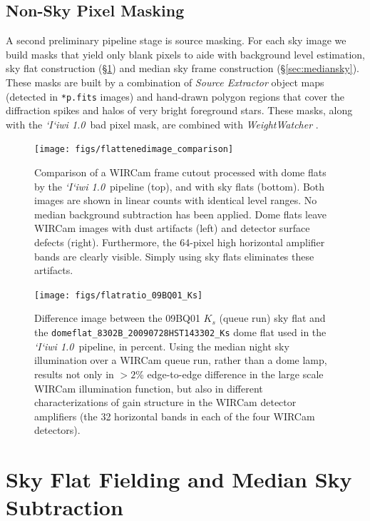 \documentclass[iop]{emulateapj}
\newcommand{\sw}[1]{\textit{#1}} %
\newcommand{\iiwione}{\sw{`I`iwi 1.0}}
\newcommand{\Sec}[1]{\S\ref{sec:#1}}  %
\begin{document}
\subsection{Non-Sky Pixel Masking}

A second preliminary pipeline stage is source masking.
For each sky image we build masks that yield only blank pixels to aide with background level estimation, sky flat construction (\Sec{flats}) and median sky frame construction (\Sec{mediansky}).
These masks are built by a combination of \sw{Source Extractor} object maps (detected in \texttt{*p.fits} images) and hand-drawn polygon regions that cover the diffraction spikes and halos of very bright foreground stars.
These masks, along with the \iiwione\ bad pixel mask, are combined with \sw{WeightWatcher} \citep{Marmo:2008}.

\begin{figure}[t]
\centering
\texttt{[image: figs/flattenedimage\_comparison]}
\caption{Comparison of a WIRCam frame cutout processed with dome flats by the \iiwione\ pipeline (top), and with sky flats (bottom).
Both images are shown in linear counts with identical level ranges.
No median background subtraction has been applied.
Dome flats leave WIRCam images with dust artifacts (left) and detector surface defects (right). Furthermore, the 64-pixel high horizontal amplifier bands are clearly visible.
Simply using sky flats eliminates these artifacts.
}
\label{fig:flattenedimage_comparison}
\end{figure}

\begin{figure}[t]
\centering
\texttt{[image: figs/flatratio\_09BQ01\_Ks]}
\caption{Difference image between the 09BQ01 $K_s$ (queue run) sky flat and the \texttt{domeflat\_8302B\_20090728HST143302\_Ks} dome flat used in the \iiwione\ pipeline, in percent.
Using the median night sky illumination over a WIRCam queue run, rather than a dome lamp, results not only in $>2$\% edge-to-edge difference in the large scale WIRCam illumination function, but also in different characterizations of gain structure in the WIRCam detector amplifiers (the 32 horizontal bands in each of the four WIRCam detectors).}
\label{fig:domeflatratio}
\end{figure}

\section{Sky Flat Fielding and Median Sky Subtraction}
\label{sec:flats}
\end{document}
